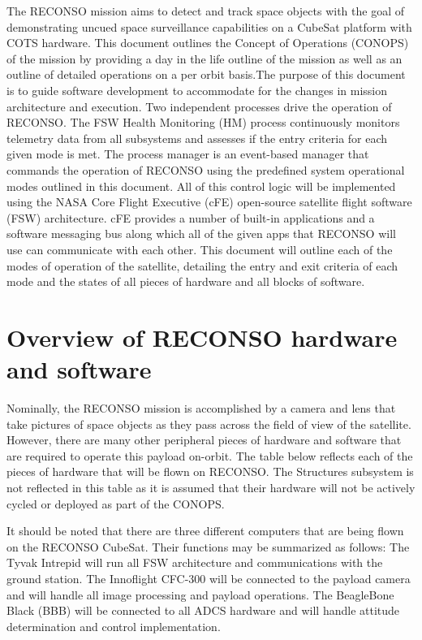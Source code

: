 \documentclass{article}
\begin{document}
The RECONSO mission aims to detect and track space objects with the goal of demonstrating uncued space surveillance capabilities on a CubeSat platform with COTS hardware. This document outlines the Concept of Operations (CONOPS) of the mission by providing a day in the life outline of the mission as well as an outline of detailed operations on a per orbit basis.The purpose of this document is to guide software development to accommodate for the changes in mission architecture and execution.
Two independent processes drive the operation of RECONSO. The FSW Health Monitoring (HM) process continuously monitors telemetry data from all subsystems and assesses if the entry criteria for each given mode is met. The process manager is an event-based manager that commands the operation of RECONSO using the predefined system operational modes outlined in this document. All of this control logic will be implemented using the NASA Core Flight Executive (cFE) open-source satellite flight software (FSW) architecture. cFE provides a number of built-in applications and a software messaging bus along which all of the given apps that RECONSO will use can communicate with each other. This document will outline each of the modes of operation of the satellite, detailing the entry and exit criteria of each mode and the states of all pieces of hardware and all blocks of software.

\section{Overview of RECONSO hardware and software}

Nominally, the RECONSO mission is accomplished by a camera and lens that take pictures of space objects as they pass across the field of view of the satellite. However, there are many other peripheral pieces of hardware and software that are required to operate this payload on-orbit. The table below reflects each of the pieces of hardware that will be flown on RECONSO. The Structures subsystem is not reflected in this table as it is assumed that their hardware will not be actively cycled or deployed as part of the CONOPS.

It should be noted that there are three different computers that are being flown on the RECONSO CubeSat. Their functions may be summarized as follows: The Tyvak Intrepid will run all FSW architecture and communications with the ground station. The Innoflight CFC-300 will be connected to the payload camera and will handle all image processing and payload operations. The BeagleBone Black (BBB) will be connected to all ADCS hardware and will handle attitude determination and control implementation.
\end{document}
